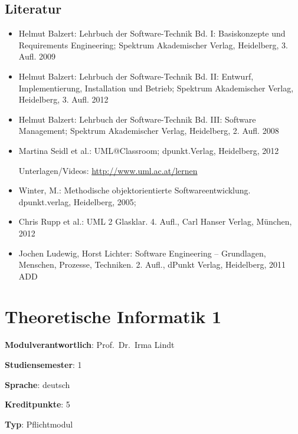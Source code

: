 \hypertarget{literaturpathlabelmi-2017modulbeschreibungen-bachelorba_softwaretechnik}{%
\section*{Literatur\label{/mi-2017/modulbeschreibungen-bachelor/BA_Softwaretechnik}}\label{literaturpathlabelmi-2017modulbeschreibungen-bachelorba_softwaretechnik}}

\begin{itemize}
\tightlist
\item
  Helmut Balzert: Lehrbuch der Software-Technik Bd. I: Basiskonzepte und
  Requirements Engineering; Spektrum Akademischer Verlag, Heidelberg, 3.
  Aufl. 2009
\item
  Helmut Balzert: Lehrbuch der Software-Technik Bd. II: Entwurf,
  Implementierung, Installation und Betrieb; Spektrum Akademischer
  Verlag, Heidelberg, 3. Aufl. 2012
\item
  Helmut Balzert: Lehrbuch der Software-Technik Bd. III: Software
  Management; Spektrum Akademischer Verlag, Heidelberg, 2. Aufl. 2008
\item
  Martina Seidl et al.: UML@Classroom; dpunkt.Verlag, Heidelberg, 2012

  Unterlagen/Videos: \url{http://www.uml.ac.at/lernen}
\item
  Winter, M.: Methodische objektorientierte Softwareentwicklung.
  dpunkt.verlag, Heidelberg, 2005;
\item
  Chris Rupp et al.: UML 2 Glasklar. 4. Aufl., Carl Hanser Verlag,
  München, 2012
\item
  Jochen Ludewig, Horst Lichter: Software Engineering -- Grundlagen,
  Menschen, Prozesse, Techniken. 2. Aufl., dPunkt Verlag, Heidelberg,
  2011 ADD
\end{itemize}

\hypertarget{theoretische-informatik-1pathlabelmi-2017modulbeschreibungen-bachelorba_theoretischeinformatik1}{%
\chapter{Theoretische Informatik
1\label{/mi-2017/modulbeschreibungen-bachelor/BA_TheoretischeInformatik1}}\label{theoretische-informatik-1pathlabelmi-2017modulbeschreibungen-bachelorba_theoretischeinformatik1}}

\begin{modulHead}
\textbf{Modulverantwortlich}: Prof.~Dr.~Irma
Lindt
\end{modulHead}
\begin{modulHead}
\textbf{Studiensemester}:
1
\end{modulHead}
\begin{modulHead}
\textbf{Sprache}:
deutsch
\end{modulHead}
\begin{modulHead}
\textbf{Kreditpunkte}:
5
\end{modulHead}
\begin{modulHead}
\textbf{Typ}:
Pflichtmodul
\end{modulHead}


